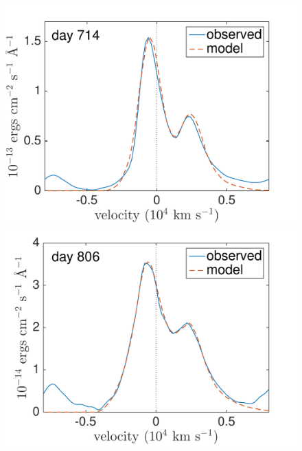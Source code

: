 \begin{figure}
\includegraphics[trim = 0 35 0 0,clip=true,scale=0.37]{chapters/chapter5/images/clump_1/maximum/d714OI_ext.pdf}
\hspace{0mm}
\includegraphics[trim =0 35 0 0,clip=true,scale=0.37]{chapters/chapter5/images/clump_1/maximum/d806OI_ext.pdf}


\end{figure}
